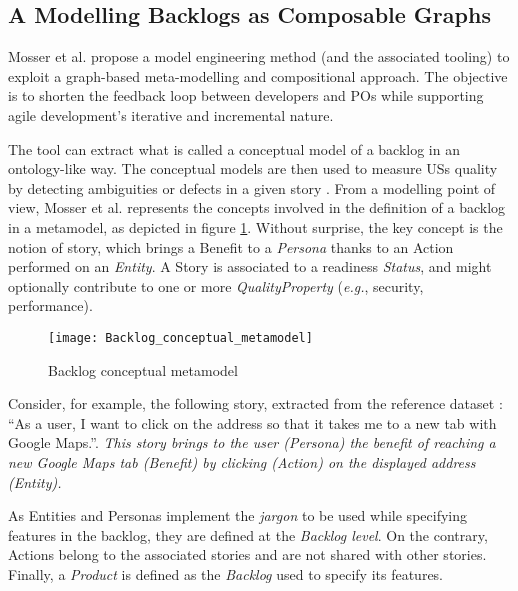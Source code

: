 \subsection{A Modelling Backlogs as Composable Graphs} \label{composable_graph}
Mosser et al. propose a model engineering method (and the associated tooling) to exploit a graph-based meta-modelling and compositional approach. The objective is to shorten the feedback loop between developers and POs while supporting agile development’s iterative and incremental nature. 

The tool can extract what is called a conceptual model of a backlog in an ontology-like way. The conceptual models are then used to measure USs quality by detecting ambiguities or defects in a given story \cite{mosser2022modelling}.
From a modelling point of view, Mosser et al. represents the concepts involved in the deﬁnition of a backlog in a metamodel, as depicted in figure \ref{fig:conceptual_metamodel}. Without surprise, the key concept is the notion of story, which brings a Benefit to a \emph{Persona} thanks to an Action performed on an \emph{Entity}. A Story is associated to a readiness \emph{Status}, and might optionally contribute to one or more \emph{QualityProperty} (\emph{e.g.}, security, performance).
\begin{figure}
\center
\texttt{[image: Backlog\_conceptual\_metamodel]}
\caption{Backlog conceptual metamodel \cite{mosser2022modelling}}\label{fig:conceptual_metamodel}
\end{figure}

Consider, for example, the following story, extracted from the reference dataset \cite{Dalpiaz2018}: \enquote{As a user, I want to click on the address so that it takes me to a new tab with Google Maps.}. \emph{This story brings to the user (Persona) the beneﬁt of reaching a new Google Maps tab (Benefit) by clicking (Action) on the displayed address (Entity).}

As Entities and Personas implement the \emph{jargon} to be used while specifying features in the backlog, they are deﬁned at the \emph{Backlog level}. On the contrary, Actions belong to the associated stories and are not shared with other stories. Finally, a \emph{Product} is deﬁned as the \emph{Backlog} used to specify its features.

